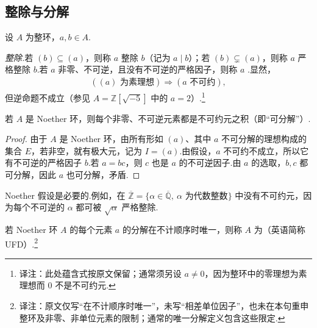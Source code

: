 \subsection{整除与分解}\label{sec:nt-2-1-2}
设 $A$ 为整环，$a,b\in A$.

\emph{整除.}若 $(b)\subseteq(a)$，则称 $a$ 整除 $b$（记为 $a\mid b$）；若 $(b)\subsetneq(a)$，则称 $a$ 严格整除 $b$.若 $a$ 非零、不可逆，且没有不可逆的严格因子，则称 $a$ .显然，
\begin{align*}
((a)\text{ 为素理想})\Rightarrow(a\text{ 不可约}),
\end{align*}
但逆命题不成立（参见 $A=\mathbb Z[\sqrt{-5}]$ 中的 $a=2$）.\footnote{译注：此处蕴含式按原文保留；通常须另设 $a\ne0$，因为整环中的零理想为素理想而 $0$ 不是不可约元.}

\begin{proposition*}
若 $A$ 是 Noether 环，则每个非零、不可逆元素都是不可约元之积（即``可分解''）.
\end{proposition*}
\begin{proof}
由于 $A$ 是 Noether 环，由所有形如 $(a)$、其中 $a$ 不可分解的理想构成的集合 $E$，若非空，就有极大元，记为 $I=(a)$.由假设，$a$ 不可约不成立，所以它有不可逆的严格因子 $b$.若 $a=bc$，则 $c$ 也是 $a$ 的不可逆因子.由 $a$ 的选取，$b,c$ 都可分解，因此 $a$ 也可分解，矛盾.
\end{proof}
\begin{remark*}
Noether 假设是必要的.例如，在 $\overline{\mathbb Z}=\{\alpha\in\overline{\mathbb Q},\ \alpha\text{ 为代数整数}\}$ 中没有不可约元，因为每个不可逆的 $\alpha$ 都可被 $\sqrt\alpha$ 严格整除.
\end{remark*}
若 Noether 环 $A$ 的每个元素 $a$ 的分解在不计顺序时唯一，则称 $A$ 为（英语简称 UFD）.\footnote{译注：原文仅写``在不计顺序时唯一''，未写``相差单位因子''，也未在本句重申整环及非零、非单位元素的限制；通常的唯一分解定义包含这些限定.}

